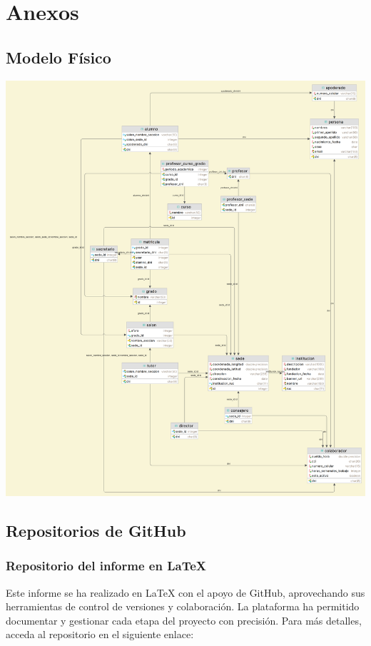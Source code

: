 \section{Anexos}
\subsection{Modelo Físico}
\begin{center}
    \includegraphics[width=\linewidth, height=0.75\textheight, keepaspectratio]{figures/modelo_fisico.png}
\end{center}
\subsection{Repositorios de GitHub}
\subsubsection{Repositorio del informe en LaTeX}{
    Este informe se ha realizado en LaTeX con el apoyo de GitHub, aprovechando sus herramientas de control de versiones y colaboración. La plataforma ha permitido documentar y gestionar cada etapa del proyecto con precisión. Para más detalles, acceda al repositorio en el siguiente enlace: 
}
